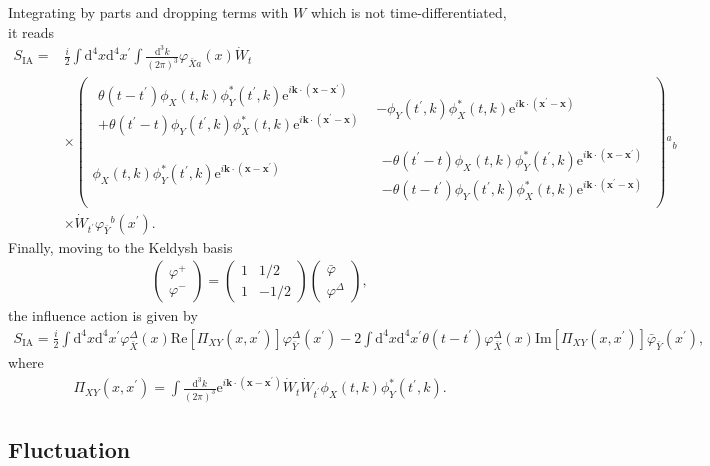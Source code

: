 \documentclass[aps, prd
, preprint
, nofootinbib 
]{revtex4-1}
\newcommand{\dd}{\mathrm{d}}
\newcommand{\ee}{\mathrm{e}}
\renewcommand{\Re}{\mathrm{Re}}
\renewcommand{\Im}{\mathrm{Im}}
\newcommand{\dk}{\frac{\dd^3k}{(2\pi)^3}}
\newcommand{\SIA}{S_\text{IA}}
\newcommand{\bae}[1]{\begin{align} #1 \end{align}}
\newcommand{\bpme}[1]{\begin{pmatrix} #1 \end{pmatrix}}
\begin{document}
Integrating by parts and dropping terms with $W$ which is not time-differentiated, it reads
\bae{
	\SIA=&\frac{i}{2}\int\dd^4x\dd^4x^\prime\int\dk\varphi_{\bar{X}a}(x)\dot{W}_t \nonumber \\
	&\times\bpme{
		\begin{array}{c}
			\theta(t-t^\prime)\phi_X(t,k)\phi^*_Y(t^\prime,k)\ee^{i\mathbf{k}\cdot(\mathbf{x}-\mathbf{x}^\prime)} \\
			+\theta(t^\prime-t)\phi_Y(t^\prime,k)\phi^*_X(t,k)\ee^{i\mathbf{k}\cdot(\mathbf{x}^\prime-\mathbf{x})}
		\end{array} &
		-\phi_Y(t^\prime,k)\phi^*_X(t,k)\ee^{i\mathbf{k}\cdot(\mathbf{x}^\prime-\mathbf{x})} \\
		\phi_X(t,k)\phi^*_Y(t^\prime,k)\ee^{i\mathbf{k}\cdot(\mathbf{x}-\mathbf{x}^\prime)} &
		\begin{array}{c}
			-\theta(t^\prime-t)\phi_X(t,k)\phi^*_Y(t^\prime,k)\ee^{i\mathbf{k}\cdot(\mathbf{x}-\mathbf{x}^\prime)} \\
			-\theta(t-t^\prime)\phi_Y(t^\prime,k)\phi^*_X(t,k)\ee^{i\mathbf{k}\cdot(\mathbf{x}^\prime-\mathbf{x})}
		\end{array}
	}{}^a{}_b \nonumber \\
	&\times \dot{W}_{t^\prime}\varphi_{\bar{Y}}{}^b(x^\prime).
}
Finally, moving to the Keldysh basis 
\bae{
	\bpme{
		\varphi^+ \\ \varphi^-
	}
	=\bpme{
		1 & 1/2 \\
		1 & -1/2
	}\bpme{
		\bar{\varphi} \\ \varphi^\Delta
	},
}
the influence action is given by
\bae{
	\SIA=\frac{i}{2}\int\dd^4x\dd^4x^\prime\varphi_{\bar{X}}^\Delta(x)\Re[\Pi_{XY}(x,x^\prime)]\varphi_{\bar{Y}}^\Delta(x^\prime)
	-2\int\dd^4x\dd^4x^\prime\theta(t-t^\prime)\varphi_{\bar{X}}^\Delta(x)\Im[\Pi_{XY}(x,x^\prime)]\bar{\varphi}_{\bar{Y}}(x^\prime),
}
where
\bae{
	\Pi_{XY}(x,x^\prime)=\int\dk\ee^{i\mathbf{k}\cdot(\mathbf{x}-\mathbf{x}^\prime)}\dot{W}_t\dot{W}_{t^\prime}\phi_X(t,k)\phi_Y^*(t^\prime,k).
}




\subsection{Fluctuation}
\end{document}
